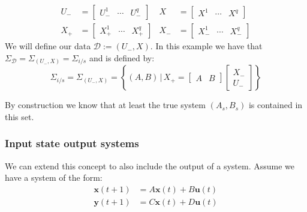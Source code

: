 \begin{align*}
	U_{-} &= \left[ \begin{array}{ccc} U^{1}_{-} & \cdots & U^{q}_{-} \end{array} \right] &
	X     &= \left[ \begin{array}{ccc} X^{1}     & \cdots & X^{q}     \end{array} \right] \\
	X_{+} &= \left[ \begin{array}{ccc} X^{1}_{+} & \cdots & X^{q}_{+} \end{array} \right] &
	X_{-} &= \left[ \begin{array}{ccc} X^{1}_{-} & \cdots & X^{q}_{-} \end{array} \right]
\end{align*}
We will define our data $\mathcal{D} := (U_-, X)$. In this example we have that $\Sigma_\mathcal{D} = \Sigma_{(U_-,X)} = \Sigma_{i/s}$ and is defined by:
\begin{equation} \label{isSet}
	\Sigma_{i/s} = \Sigma_{(U_-,X)} = \left\{ (A, B) \, | \, X_{+} = \begin{bmatrix} A & B \end{bmatrix} \begin{bmatrix} X_{-} \\ U_{-} \end{bmatrix} \right\}
\end{equation}

By construction we know that at least the true system $(A_s,B_s)$ is contained in this set.


\subsubsection*{Input state output systems}
We can extend this concept to also include the output of a system. Assume we have a system of the form:
\begin{subequations}\label{isoSystem}
	\begin{align}
		\mathbf{x}(t+1) &= A \mathbf{x}(t) + B \mathbf{u}(t) \\
		\mathbf{y}(t+1) &= C \mathbf{x}(t) + D \mathbf{u}(t)
	\end{align}
\end{subequations}


